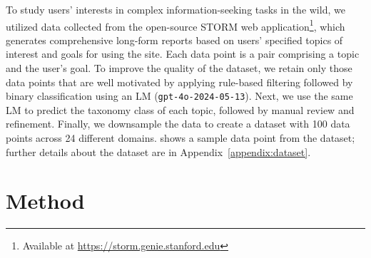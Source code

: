 \documentclass[11pt]{article}
\begin{document}
To study users’ interests in complex information-seeking tasks in the wild,
we utilized data collected from the open-source STORM web application\footnote{Available at \url{https://storm.genie.stanford.edu}}, which generates comprehensive long-form reports based on users’ specified topics of interest and goals for using the site. %
Each data point is a pair comprising a topic and the user's goal. 
To improve the quality of the dataset, we retain only those data points that are well motivated by applying rule-based filtering followed by binary classification using an LM (\texttt{gpt-4o-2024-05-13}). Next, we use the same LM to predict the taxonomy class of each topic, followed by manual review and refinement. Finally, we downsample the data to create a dataset with 100 data points across 24 different domains.  shows a sample data point from the dataset; further details about the dataset are in Appendix~\ref{appendix:dataset}. 





\section{Method}

\end{document}
